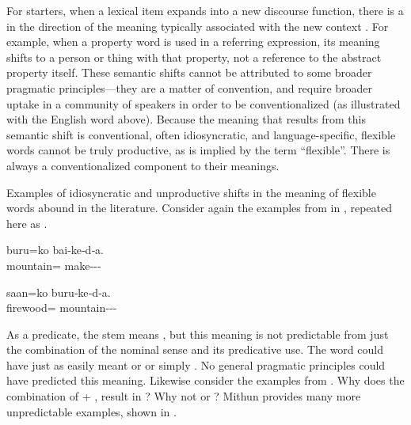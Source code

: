 For starters, when a lexical item expands into a new discourse function, there is a  in the direction of the meaning typically associated with the new context \parencites[74--77]{Croft1991}[73]{Croft2001b}. For example, when a property word is used in a referring expression, its meaning shifts to a person or thing with that property, not a reference to the abstract property itself. These semantic shifts cannot be attributed to some broader pragmatic principles—they are a matter of convention, and require broader uptake in a community of speakers in order to be conventionalized (as illustrated with the English word  above). Because the meaning that results from this semantic shift is conventional, often idiosyncratic, and language-specific, flexible words cannot be truly productive, as is implied by the term \enquote{flexible}. There is always a conventionalized component to their meanings.

Examples of idiosyncratic and unproductive shifts in the meaning of flexible words abound in the literature. Consider again the examples from  in , repeated here as .

\begin{exe}
  \ex\label{ex:2.16}
  \begin{xlist}

    \ex
    \gll buru=ko                bai‑ke‑d‑a.\\
         mountain= make‑‑‑\\

    \ex
    \gll saan=ko                buru‑ke‑d‑a.\\
         firewood= mountain‑‑‑\\

  \end{xlist}
\end{exe}

\noindent As a predicate, the stem  means , but this meaning is not predictable from just the combination of the nominal sense  and its predicative use. The word could have just as easily meant  or  or simply . No general pragmatic principles could have predicted this meaning. Likewise consider the  examples from . Why does the combination of   +  ,  result in  ? Why not  or ? Mithun provides many more unpredictable examples, shown in .


